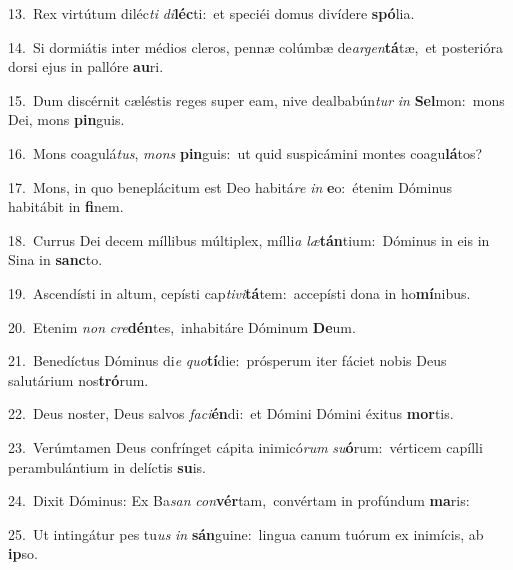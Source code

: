 {\numbfont\textcolor{\numbcolor}{13.}}~Rex virtútum diléc\textit{ti} \textit{di}\-\textbf{léc}ti:~\star et speciéi domus divídere \textbf{spó}\-lia.\par
{\numbfont\textcolor{\numbcolor}{14.}}~Si dormiátis inter médios cleros, pennæ colúmbæ de\-\textit{ar}\-\textit{gen}\textbf{tá}tæ,~\star et posterióra dorsi ejus in pallóre \textbf{au}\-ri.\par
{\numbfont\textcolor{\numbcolor}{15.}}~Dum discérnit cæléstis reges super eam, nive dealbabún\textit{tur} \textit{in} \textbf{Sel}\-mon:~\star mons Dei, mons \textbf{pin}\-guis.\par
{\numbfont\textcolor{\numbcolor}{16.}}~Mons coagulá\-\textit{tus}\-, \textit{mons} \textbf{pin}\-guis:~\star ut quid suspicámini montes coagu\-\textbf{lá}\-tos?\par
{\numbfont\textcolor{\numbcolor}{17.}}~Mons, in quo beneplácitum est Deo habitá\textit{re} \textit{in} \textbf{e}\-o:~\star étenim Dóminus habitábit in \textbf{fi}\-nem.\par
{\numbfont\textcolor{\numbcolor}{18.}}~Currus Dei decem míllibus múltiplex, mílli\textit{a} \textit{læ}\-\textbf{tán}tium:~\star Dóminus in eis in Sina in \textbf{sanc}\-to.\par
{\numbfont\textcolor{\numbcolor}{19.}}~Ascendísti in altum, cepísti cap\-\textit{ti}\-\textit{vi}\textbf{tá}tem:~\star accepísti dona in ho\-\textbf{mí}\-nibus.\par
{\numbfont\textcolor{\numbcolor}{20.}}~Etenim \textit{non} \textit{cre}\-\textbf{dén}tes,~\star inhabitáre Dóminum \textbf{De}\-um.\par
{\numbfont\textcolor{\numbcolor}{21.}}~Benedíctus Dóminus di\textit{e} \textit{quo}\-\textbf{tí}die:~\star prósperum iter fáciet nobis Deus salutárium nos\-\textbf{tró}\-rum.\par
{\numbfont\textcolor{\numbcolor}{22.}}~Deus noster, Deus salvos \textit{fa}\-\textit{ci}\textbf{én}di:~\star et Dómini Dómini éxitus \textbf{mor}\-tis.\par
{\numbfont\textcolor{\numbcolor}{23.}}~Verúmtamen Deus confrínget cápita inimicó\textit{rum} \textit{su}\-\textbf{ó}rum:~\star vérticem capílli perambulántium in delíctis \textbf{su}\-is.\par
{\numbfont\textcolor{\numbcolor}{24.}}~Dixit Dóminus: Ex Ba\textit{san} \textit{con}\-\textbf{vér}tam,~\star convértam in profúndum \textbf{ma}\-ris:\par
{\numbfont\textcolor{\numbcolor}{25.}}~Ut intingátur pes tu\textit{us} \textit{in} \textbf{sán}\-guine:~\star lingua canum tuórum ex inimícis, ab \textbf{ip}\-so.\par
